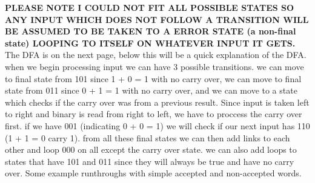 \documentclass{article}
\begin{document}
\textbf{PLEASE NOTE I COULD NOT FIT ALL POSSIBLE STATES SO ANY INPUT WHICH DOES NOT FOLLOW A TRANSITION WILL BE ASSUMED TO BE TAKEN TO A ERROR STATE (a non-final state) LOOPING TO ITSELF ON WHATEVER INPUT IT GETS.}\\
The DFA is on the next page, below this will be a quick explanation of the DFA.\\
when we begin processing input we can have 3 possible transitions. we can move to final state from 101 since 1 + 0 = 1 with no carry over, we can move to final state from 011 since 0 + 1 = 1 with no carry over, and we can move to a state which checks if the carry over was from a previous result. Since input is taken left to right and binary is read from right to left, we have to proccess the carry over first. if we have 001 (indicating 0 + 0 = 1) we will check if our next input has 110 (1 + 1 = 0 carry 1). from all these final states we can then add links to each other and loop 000 on all except the carry over state. we can also add loops to states that have 101 and 011 since they will always be true and have no carry over.
Some example runthroughs with simple accepted and non-accepted words.
\end{document}
